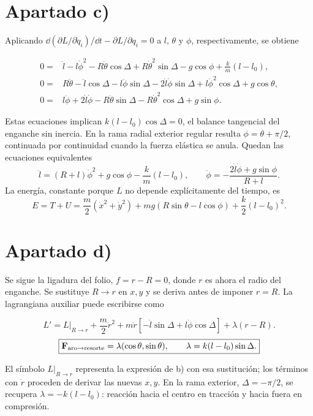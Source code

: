 \documentclass[11pt,a4paper]{article}
\begin{document}

\newpage
\section{Apartado c)}\label{sec:c}
Aplicando $\dd(\partial L/\partial\dot q_i)/\dd t-\partial L/\partial q_i=0$ a $l$, $\theta$ y $\phi$, respectivamente, se obtiene
\begin{resultado}
\begin{align}
 0={}&\ddot l-l\dot\phi^2-R\ddot\theta\cos\Delta
       +R\dot\theta^2\sin\Delta-g\cos\phi+\frac km(l-l_0),\\
 0={}&R\ddot\theta-\ddot l\cos\Delta-l\ddot\phi\sin\Delta
       -2\dot l\dot\phi\sin\Delta+l\dot\phi^2\cos\Delta+g\cos\theta,\\
 0={}&l\ddot\phi+2\dot l\dot\phi-R\ddot\theta\sin\Delta
       -R\dot\theta^2\cos\Delta+g\sin\phi.
\end{align}
\end{resultado}
Estas ecuaciones implican $k(l-l_0)\cos\Delta=0$, el balance tangencial del enganche sin inercia. En la rama radial exterior regular resulta $\phi=\theta+\pi/2$, continuada por continuidad cuando la fuerza elástica se anula. Quedan las ecuaciones equivalentes
\begin{equation}
 \ddot l=(R+l)\dot\phi^2+g\cos\phi-\frac km(l-l_0),\qquad
 \ddot\phi=-\frac{2\dot l\dot\phi+g\sin\phi}{R+l}.
\end{equation}
La energía, constante porque $L$ no depende explícitamente del tiempo, es
\begin{equation}
 \boxed{E=T+U=\frac m2(\dot x^2+\dot y^2)
 +mg(R\sin\theta-l\cos\phi)+\frac k2(l-l_0)^2.}
\end{equation}

\section{Apartado d)}\label{sec:d}
Se sigue la ligadura del folio, $f=r-R=0$, donde $r$ es ahora el radio del enganche. Se sustituye $R\to r$ en $x,y$ y se deriva antes de imponer $r=R$. La lagrangiana auxiliar puede escribirse como
\begin{resultado}
\begin{equation}
 L'=L\big|_{R\to r}+\frac m2\dot r^2
 +m\dot r[-\dot l\sin\Delta+l\dot\phi\cos\Delta]+\lambda(r-R).
\end{equation}
\begin{equation}
 \boxed{\mathbf F_{\rm aro\to resorte}=\lambda(\cos\theta,\sin\theta),\qquad
 \lambda=k(l-l_0)\sin\Delta.}
\end{equation}
\end{resultado}
El símbolo $L|_{R\to r}$ representa la expresión de b) con esa sustitución; los términos con $\dot r$ proceden de derivar las nuevas $x,y$. En la rama exterior, $\Delta=-\pi/2$, se recupera $\lambda=-k(l-l_0)$: reacción hacia el centro en tracción y hacia fuera en compresión.
\end{document}
